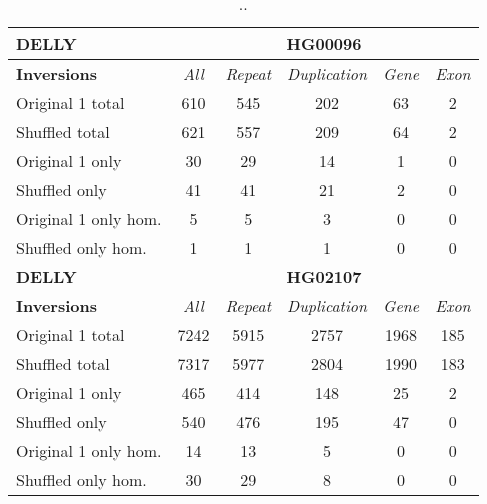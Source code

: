 \begin{table}[htb]
\begin{center}
\begin{tabular}{|l|c||c|c|c|c|}
\hline
{\bf DELLY} & \multicolumn{5}{|c|}{\bf HG00096} \\
\hline
\cline{2-6}
{\bf Inversions} & {\it All} & {\it Repeat} & {\it Duplication} & {\it Gene} & {\it Exon} \\
\hline
Original 1 total & 610 & 545 & 202 & 63 & 2\\ 
\hline
Shuffled total & 621 & 557 & 209 & 64 & 2\\ 
\hline
Original 1 only & 30 & 29 & 14 & 1 & 0\\ 
\hline
Shuffled only & 41 & 41 & 21 & 2 & 0\\ 
\hline
Original 1 only hom. & 5 & 5 & 3 & 0 & 0\\ 
\hline
Shuffled only hom. & 1 & 1 & 1 & 0 & 0\\ 
\hline
\hline
{\bf DELLY} & \multicolumn{5}{|c|}{\bf HG02107} \\
\hline
\cline{2-6}
{\bf Inversions} & {\it All} & {\it Repeat} & {\it Duplication} & {\it Gene} & {\it Exon} \\
\hline
Original 1 total & 7242 & 5915 & 2757 & 1968 & 185\\ 
\hline
Shuffled total & 7317 & 5977 & 2804 & 1990 & 183\\ 
\hline
Original 1 only & 465 & 414 & 148 & 25 & 2\\ 
\hline
Shuffled only & 540 & 476 & 195 & 47 & 0\\ 
\hline
Original 1 only hom. & 14 & 13 & 5 & 0 & 0\\ 
\hline
Shuffled only hom. & 30 & 29 & 8 & 0 & 0\\ 
\hline
\end{tabular}
\end{center}
\caption{ .. }
\label{tab:orig-vs-shuf-delly-inv}
\end{table}

